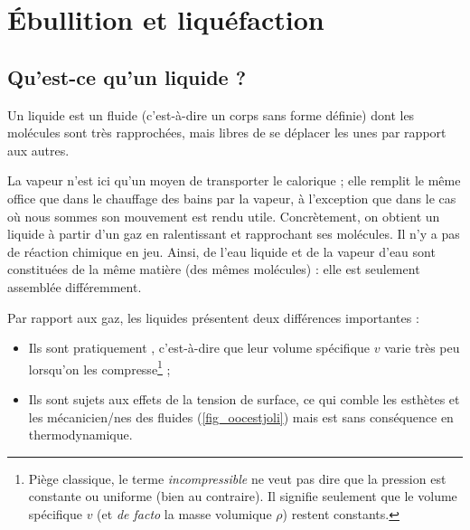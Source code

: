\section{Ébullition et liquéfaction}

	\subsection{Qu’est-ce qu’un liquide ?}
	
		Un liquide est un fluide (c’est-à-dire un corps sans forme définie) dont les molécules sont très rapprochées, mais libres de se déplacer les unes par rapport aux autres.
	
La vapeur n’est ici qu’un moyen de transporter le calorique ; elle remplit le même office que dans le chauffage des bains par la vapeur, à l’exception que dans le cas où nous sommes son mouvement est rendu utile.
		Concrètement, on obtient un liquide à partir d’un gaz en ralentissant et rapprochant ses molécules. Il n’y a pas de réaction chimique en jeu. Ainsi, de l’eau liquide et de la vapeur d’eau sont constituées de la même matière (des mêmes molécules) : elle est seulement assemblée différemment.
		
		Par rapport aux gaz, les liquides présentent deux différences importantes :
			\begin{itemize}
				\item Ils sont pratiquement , c’est-à-dire que leur volume spécifique $v$ varie très peu lorsqu’on les compresse\footnote{Piège classique, le terme \emph{incompressible} ne veut pas dire que la pression est constante ou uniforme (bien au contraire). Il signifie seulement que le volume spécifique $v$ (et \textit{de facto} la masse volumique $\rho$) restent constants.} ;
				\item Ils sont sujets aux effets de la tension de surface, ce qui comble les esthètes et les mécanicien/nes des fluides (\cref{fig_oocestjoli}) mais est sans conséquence en thermodynamique.
			\end{itemize}
	
